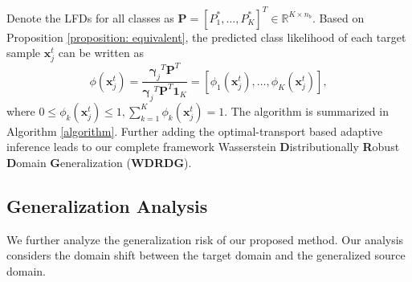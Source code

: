 \documentclass[journal]{IEEEtran}
\begin{document}
Denote the LFDs for all classes as $\boldsymbol{P}=\left[{P}_1^*,\ldots,{P}_K^*\right]^T\in\mathbb{R}^{K\times n_b}$.
Based on Proposition \ref{proposition: equivalent},
the predicted class likelihood of each target sample $\boldsymbol{x}^t_j$ can be written as
\begin{equation}
\label{eq:classifier}
\phi(\boldsymbol{x}^t_j)=\frac{ {{\boldsymbol{\gamma}_j}}^T \boldsymbol{P}^T}{ {{\boldsymbol{\gamma}_j}}^{T} \boldsymbol{P}^{T}\boldsymbol{1}_{K}}=\left[\phi_1(\boldsymbol{x}^t_j), \ldots, \phi_{K}\left(\boldsymbol{x}^t_j\right)\right],
\end{equation}
where $0\leq \phi_k\left(\boldsymbol{x}^t_j\right)\leq 1, \sum_{k=1}^{K} \phi_k\left(\boldsymbol{x}^t_j\right) = 1$.
The algorithm is summarized in Algorithm \ref{algorithm}.
Further adding the optimal-transport based adaptive inference leads to our complete framework Wasserstein \textbf{D}istributionally \textbf{R}obust \textbf{D}omain \textbf{G}eneralization (\textbf{WDRDG}).


\subsection{Generalization Analysis}\label{sec:bound}

We further analyze the generalization risk of our proposed method.
Our analysis
considers the domain shift between the target domain and the generalized source domain. 
\end{document}

